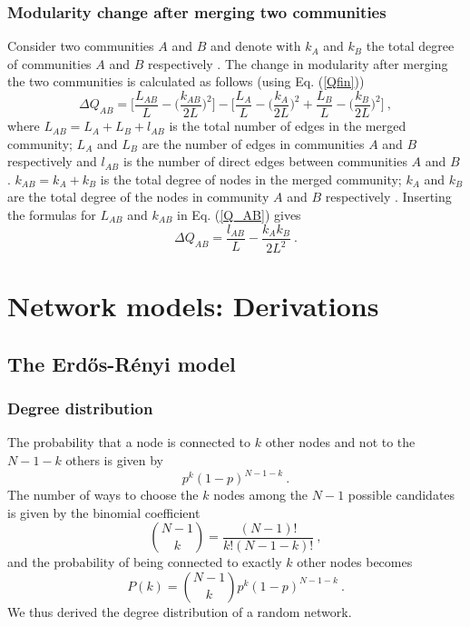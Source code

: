 \documentclass[11 pt , letterpaper , twoside , openright]{book}
\begin{document}
\subsection{Modularity change after merging two communities}\label{modchange}

Consider two communities $A$ and $B$ and denote with $k_A$ and $k_B$ the total degree of communities $A$ and $B$ respectively \cite{Albert2016}. The change in modularity after merging the two communities is calculated as follows (using Eq. (\ref{Qfin})) \cite{Albert2016}
\begin{equation}\label{Q_AB}
	\Delta Q_{AB} = \bigg[\frac{L_{AB}}{L} - \bigg(\frac{k_{AB}}{2L} \bigg)^2 \bigg] - \bigg[\frac{L_A}{L} - \bigg(\frac{k_A}{2L} \bigg)^2 + \frac{L_B}{L} - \bigg(\frac{k_B}{2L} \bigg)^2 \bigg] \ ,
\end{equation}
where $L_{AB} = L_A + L_B + l_{AB}$ is the total number of edges in the merged community; $L_A$ and $L_B$ are the number of edges in communities $A$ and $B$ respectively and $l_{AB}$ is the number of direct edges between communities $A$ and $B$ \cite{Albert2016}. $k_{AB} = k_A + k_B$ is the total degree of nodes in the merged community; $k_A$ and $k_B$ are the total degree of the nodes in community $A$ and $B$ respectively \cite{Albert2016}. Inserting the formulas for $L_{AB}$ and $k_{AB}$ in Eq. (\ref{Q_AB}) gives
\begin{equation}
	\Delta Q_{AB} = \frac{l_{AB}}{L} - \frac{k_Ak_B}{2L^2} \ .
\end{equation}

\chapter{Network models: Derivations}
\section{The Erd\H{o}s-R\'{e}nyi model}\label{ER}
\subsection{Degree distribution}\label{degdis}
The probability that a node is connected to $k$ other nodes and not to the $N-1-k$ others is given by
\begin{equation}
	p^k (1-p)^{N-1-k} \ .
\end{equation}
The number of ways to choose the $k$ nodes among the $N-1$ possible candidates is given by the binomial coefficient
\begin{equation}
	\binom{N-1}{k} = \frac{(N-1)!}{k!(N-1-k)!} \ ,
\end{equation}
and the probability of being connected to exactly $k$ other nodes becomes
\begin{equation}
	P(k) = \binom{N-1}{k}p^k (1-p)^{N-1-k} \ .
\end{equation}
We thus derived the degree distribution of a random network.
\end{document}
